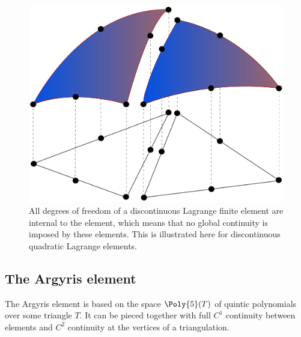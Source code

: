 \begin{figure}
  \centering
  \includegraphics[width=\smallfig]{chapters/kirby-6/pdf/dgspace.pdf}
  \caption{All degrees of freedom of a discontinuous Lagrange finite
    element are internal to the element, which means that no global
    continuity is imposed by these elements. This is illustrated
    here for discontinuous quadratic Lagrange elements.}
\end{figure}


\subsection{The Argyris element}

The Argyris element \citep{ArgyrisFriedScharpf1968,Ciarlet2002} is
based on the space $\Poly{5}(T)$ of quintic polynomials over some triangle
$T$.  It can be pieced together with full $C^1$ continuity between
elements and $C^2$ continuity at the vertices of a triangulation.

